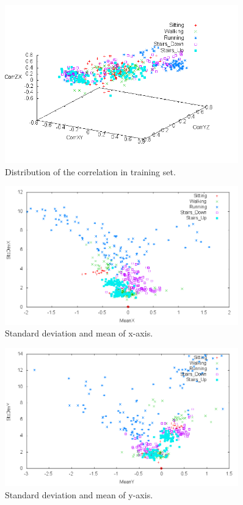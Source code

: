 \begin{figure}[ht]
    \centering
    \includegraphics[width=0.9\textwidth]{../../data/training-plots/Corr.png}
    \caption{Distribution of the correlation in training set.}
    \label{fig:training-plot-corr}
\end{figure}

\begin{figure}[ht]
    \centering
    \includegraphics[width=0.9\textwidth]{../../data/training-plots/X.png}
    \caption{Standard deviation and mean of x-axis.}
    \label{fig:training-plot-x}
\end{figure}

\begin{figure}[ht]
    \centering
    \includegraphics[width=0.9\textwidth]{../../data/training-plots/Y.png}
    \caption{Standard deviation and mean of y-axis.}
    \label{fig:training-plot-y}
\end{figure}

